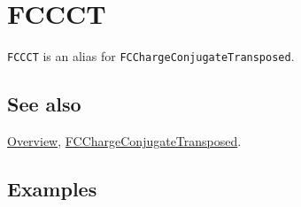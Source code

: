 \documentclass[../FeynCalcManual.tex]{subfiles}
\begin{document}
\hypertarget{fccct}{%
\section{FCCCT}\label{fccct}}

\texttt{FCCCT} is an alias for \texttt{FCChargeConjugateTransposed}.

\subsection{See also}

\hyperlink{toc}{Overview},
\hyperlink{fcchargeconjugatetransposed}{FCChargeConjugateTransposed}.

\subsection{Examples}
\end{document}
